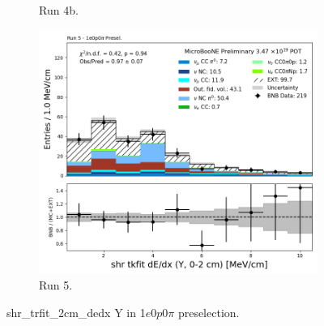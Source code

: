 \begin{figure}[H]
\begin{subfigure}[t]{0.32\linewidth}
        \caption{Run 4b.}
    \end{subfigure}%
    \hspace{0.2cm}%
    \begin{subfigure}[t]{0.32\linewidth}
        \includegraphics[width=\linewidth]{technote/Appendix_Preselection/Figures/1e0p0pi/Run5/shr_tkfit_2cm_dedx_Y_Run5_1e0p0pi_Presel.png}
        \caption{Run 5.}
    \end{subfigure}
    \caption{shr\_trfit\_2cm\_dedx Y in 1$e$0$p$0$\pi$ preselection.}
\end{figure}

